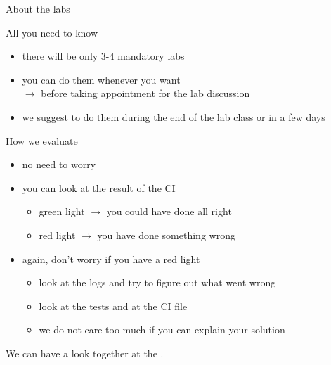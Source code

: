 \documentclass[presentation]{beamer}\mode<presentation>{\usetheme{AMSBolognaFC}}
\begin{document}
\begin{frame}[c,allowframebreaks]{About the labs}

    \begin{block}{All you need to know}
        \begin{itemize}
            \item there will be only 3-4 mandatory labs
            \item you can do them whenever you want
            \\
            $\rightarrow$ \alert{before taking appointment for the lab discussion}
            \item we suggest to do them during the end of the lab class or in a few days
        \end{itemize}
    \end{block}

    \framebreak

    \begin{block}{How we evaluate}
        \begin{itemize}
            \item no need to worry
            \item you can look at the result of the CI
            \begin{itemize}
                \item {\color{green} green light} $\rightarrow$ you could have done all right
                \item {\color{red} red light} $\rightarrow$ you have done something wrong
            \end{itemize}
            \item again, don't worry if you have a red light
            \begin{itemize}
                \item look at the logs and try to figure out what went wrong
                \item look at the tests and at the CI file
                \item we do not care too much if you can explain your solution
            \end{itemize}
        \end{itemize}
    \end{block}
    We can have a look together at the .
\end{frame}
\end{document}
